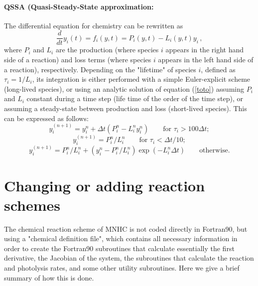 \paragraph*{QSSA (Quasi-Steady-State approximation:} \citet{Hesstvedt1978}
\par\noindent
The differential equation for chemistry can be rewritten as
\begin{equation}
  \frac{d}{dt} y_i(t) = f_i (y,t) = P_i(y,t) - L_i(y,t) y_i
  \,,
  \label{toto}
\end{equation}
where $P_i$ and $L_i$ are the production 
(where species $i$ appears in the right hand side of a reaction)
and loss terms (where species $i$ appears in the left 
hand side of a reaction), respectively.
Depending on the "lifetime" of species $i$, defined as
$\tau_i = 1/L_i$, its integration is either performed with a
simple Euler-explicit scheme (long-lived species), or
using an analytic solution of equation (\ref{toto}) assuming
$P_i$ and $L_i$ constant during a time step (life time of the order of the
time step), or assuming a steady-state between production and loss
(short-lived species). This can be expressed as follows:
\begin{equation}
  y_i^{(n+1)} = y_i^n + \Delta t ( P_i^n - L_i^n y_i^n ) \qquad \mbox{for }
  \tau_i > 100 \Delta t;
\end{equation}
\begin{equation}
  y_i^{(n+1)} = P_i^n / L_i^n \qquad \mbox{for }
  \tau_i < \Delta t / 10;
\end{equation}
\begin{equation}
  y_i^{(n+1)} = P_i^n / L_i^n +(y_i^n- P_i^n / L_i^n) \exp(-L_i^n\Delta t)
  \qquad \mbox{otherwise.}
\end{equation}

%
\section{Changing or adding reaction schemes}
%
The chemical reaction scheme of MNHC is not coded directly in Fortran90,
but using a "chemical definition file", which contains all necessary
information in order to create the Fortran90 subroutines that calculate
essentially the first derivative, the Jacobian of the system,
the subroutines that calculate the reaction and photolysis rates,
and some other utility subroutines.
Here we give a brief summary of how this is done.

